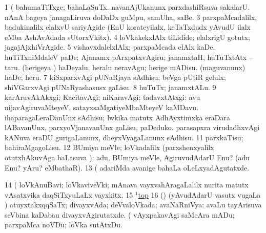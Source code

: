\begin{center}
\noindent
\gl{\pagu}
\expl{}
\bmng
\bnum
\num{1}  (  bahumaTiTxge; bahaLaSuTx. 
  
\banum
{} navanAjUkanunx parxdashiRsuva sakalarU. 
 nAnA bageya janagaLiruva doDaDx guMpu, samUha, saBe. 
\eanum
\numie
\num{3}  parxpaMcadalilx, badukinalilx elalxvU sariyAgide (EnU korateyilalx, keTaTxdudx yAvudU ilalx eMba AshAvAdada sUtorxVkitx). 
\num{4}  loVkakekxlAlx tiLidide; elalxrigU gotutx; jagajAjxhiVrAgide. 
\num{5}  vishavxdalelxlAlx; parxpaMcada elAlx kaDe. 
  
\banum
{} huTiTxniMdaleV paDe; Ajanamx pArxpatxvAgiru; janamxtaH, huTuTxtAtx -- taru. 
 (herigeya \vi) haDeyalu, heralu neravAgu; herige mADisu. 
 (maguvanunx) haDe; heru. 
\eanum
\numie
\num{7}  kiSxparxvAgi pUNaRjaya sAdhisu; beVga pUtiR gelulx; shiVGarxvAgi pUNaRyashasusx gaLisu. 
\num{8}  huTuTx; janamxtALu. 
\num{9}    karAruvAkAkxgi; KacitavAgi; niKaravAgi; tadavxtAtxgi:  avu nijavAgiruvaMteyeV, satayxsaMgatiyeMbaMteyeV kaMDavu. 
  
\banum
{} ihaparagaLeraDanUnx sAdhisu; lwkika matutx AdhAyxtimxka eraDara lABavanUnx, parxyoVjanavanUnx gaLisu, paDeduko. 
 parasapxra virudadhxvAgi kANuva eraDU gurigaLanunx, dheyxVyagaLanunx sAdhisu. 
\eanum
\numie
\num{11}  parxkaTisu; bahiraMgagoLisu. 
\num{12}  BUmiya meVle; loVkadalilx (parxshenxyalilx otutxhAkuvAga baLasuva \pagu):  adu, BUmiya meVle, AgiruvudAdarU Enu? (adu Enu? yAru? eMbathaR). 
\num{13}  (  adariMda avanige bahaLa oLeLxyadAgutatxde. 
\num{14}  (  loVkAnuBavi; loVkaviveVki; mAnava vayxvahAragaLalilx nurita matutx vAsatxvika daqSiTxyuLaLx vayxkitx. 
\num{15}  \hyperref{kandict_t.pdf}{T}{top(1) pagu(6)}{$^1$top}  
\num{16}  (\AmA) (yAvudAdarU vasutx \mo vugaLa \vi) atuyxtakxqqSaTx; divayxvAda; deVvaloVkada; avaNaRniVya:  avaLu tayArisuva seVbina kaDabau divayxvAgirutatxde. 
  (  
\banum
{} vAyxpakavAgi saMcAra mADu; parxpaMca noVDu; loVka sutAtxDu. 

\end{center}
